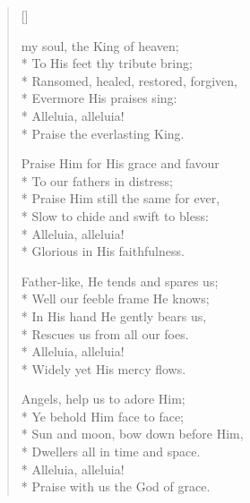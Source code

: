 \newHymn
{}

\begin{verse}[\versewidth]
\begin{altverse}
 my soul, the King of heaven;\\*
To His feet thy tribute bring;\\*
Ransomed, healed, restored, forgiven,\\*
Evermore His praises sing:\\*
Alleluia, alleluia!\\*
Praise the everlasting King.
\end{altverse}

\begin{altverse}
Praise Him for His grace and favour\\*
To our fathers in distress;\\*
Praise Him still the same for ever,\\*
Slow to chide and swift to bless:\\*
Alleluia, alleluia!\\*
Glorious in His faithfulness.
\end{altverse}

\begin{altverse}
Father-like, He tends and spares us;\\*
Well our feeble frame He knows;\\*
In His hand He gently bears us, \\*
Rescues us from all our foes.\\*
Alleluia, alleluia!\\*
Widely yet His mercy flows.
\end{altverse}

\begin{altverse}
Angels, help us to adore Him;\\*
Ye behold Him face to face;\\*
Sun and moon, bow down before Him,\\*
Dwellers all in time and space.\\*
Alleluia, alleluia!\\*
Praise with us the God of grace. 
\end{altverse}

\end{verse}


